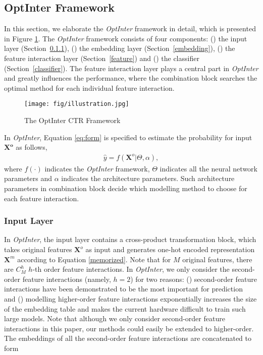 \documentclass[conference]{IEEEtran}
\begin{document}
\subsection{OptInter Framework}
\label{sec:model}

In this section, we elaborate the \textit{OptInter} framework in detail, which is presented in Figure \ref{fig:illustration}. The \textit{OptInter} framework consists of four components: () the input layer (Section~\ref{input}), () the embedding layer (Section~\ref{embedding}), () the feature interaction layer (Section~\ref{feature}) and () the classifier (Section~\ref{classifier}). The feature interaction layer plays a central part in \textit{OptInter} and greatly influences the performance, where the combination block searches the optimal method for each individual feature interaction.

\begin{figure}[!htbp]
\centering
\texttt{[image: fig/illustration.jpg]}
\caption{The OptInter CTR Framework}
\label{fig:illustration}
\end{figure}

In \textit{OptInter}, Equation \ref{eq:form} is specified to estimate the probability for input $\mathbf{X^o}$ as follows,
\begin{equation}
\begin{split}
    \hat{y} = f(\mathbf{X}^o|\Theta, \alpha),
\end{split}
\end{equation}
where $f(\cdot)$ indicates the \textit{OptInter} framework, $\Theta$ indicates all the neural network parameters and $\alpha$ indicates the architecture parameters. Such architecture parameters in combination block decide which modelling method to choose for each feature interaction.


\subsubsection{Input Layer}
\label{input}

In \textit{OptInter}, the input layer contains a cross-product transformation block, which takes original features $\mathbf{X}^{o}$ as input and generates one-hot encoded representation $\mathbf{X}^{m}$ according to Equation \ref{memorized}. Note that for $M$ original features, there are $C^h_M$ $h$-th order feature interactions. In \textit{OptInter}, we only consider the second-order feature interactions (namely, $h=2$) for two reasons: () second-order feature interactions have been demonstrated to be the most important for prediction~\cite{AutoFeature} and () modelling higher-order feature interactions exponentially increases the size of the embedding table and makes the current hardware difficult to train such large models. 
Note that although we only consider second-order feature interactions in this paper, our methods could easily be extended to higher-order. The embeddings of all the second-order feature interactions are concatenated to form
\end{document}
